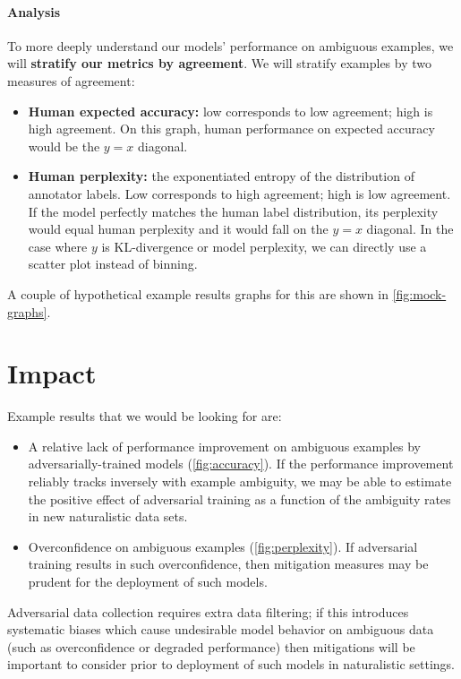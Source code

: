 \documentclass[10pt,a4paper]{article}
\begin{document}
\paragraph{Analysis}
To more deeply understand our models' performance on ambiguous examples, we will \textbf{stratify our metrics by agreement}. We will stratify examples by two measures of agreement:
\begin{itemize}
    \item \textbf{Human expected accuracy:} low corresponds to low agreement; high is high agreement. On this graph, human performance on expected accuracy would be the $y=x$ diagonal.
    \item \textbf{Human perplexity:} the exponentiated entropy of the distribution of annotator labels. Low corresponds to high agreement; high is low agreement. If the model perfectly matches the human label distribution, its perplexity would equal human perplexity and it would fall on the $y=x$ diagonal. In the case where $y$ is KL-divergence or model perplexity, we can directly use a scatter plot instead of binning.
\end{itemize}
A couple of hypothetical example results graphs for this are shown in \autoref{fig:mock-graphs}.

\section*{Impact}
Example results that we would be looking for are:
\begin{itemize}
    \item A relative lack of performance improvement on ambiguous examples by adversarially-trained models (\autoref{fig:accuracy}). If the performance improvement reliably tracks inversely with example ambiguity, we may be able to estimate the positive effect of adversarial training as a function of the ambiguity rates in new naturalistic data sets. 
    \item Overconfidence on ambiguous examples (\autoref{fig:perplexity}). If adversarial training results in such overconfidence, then mitigation measures may be prudent for the deployment of such models.
\end{itemize}
Adversarial data collection requires extra data filtering; if this introduces systematic biases which cause undesirable model behavior on ambiguous data (such as overconfidence or degraded performance) then mitigations will be important to consider prior to deployment of such models in naturalistic settings.





% 
\end{document}
